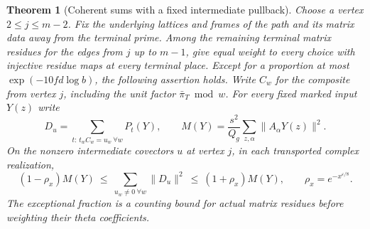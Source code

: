 \documentclass[a4paper,11pt]{article}
\newtheorem{theorem}[proposition]{Theorem}
\theoremstyle{definition}
\theoremstyle{remark}
\numberwithin{equation}{section}
\begin{document}
\begin{theorem}[Coherent sums with a fixed intermediate pullback]
\label{thm:intermediateimage392}
Choose a vertex \(2\le j\le m-2\). Fix the underlying
lattices and frames of the path and its matrix data away from
the terminal prime. Among the remaining terminal matrix
residues for the edges from \(j\) up to \(m-1\), give equal
weight to every choice with injective residue maps at every
terminal place. Except for a proportion at most
\(\exp(-10fd\log b)\), the following assertion holds.
Write \(C_w\) for the composite from vertex \(j\), including
the unit factor \(\bar\pi_T\bmod w\). For every fixed marked
input \(Y(z)\) write
\[
 D_u=\sum_{t:\,t_wC_w=u_w\ \forall w}P_t(Y),\qquad
 M(Y)=\frac{s^2}{Q_g}\sum_{z,\alpha}\|A_\alpha Y(z)\|^2 .
\]
On the nonzero intermediate covectors \(u\) at vertex \(j\),
in each transported complex realization,
\[
 (1-\rho_x)M(Y)\ \le\
           \sum_{u_w\ne0\ \forall w}\|D_u\|^2
     \ \le\ (1+\rho_x)M(Y),\qquad
                \rho_x=e^{-x^{\varepsilon/8}} .
\]
The exceptional fraction is a counting bound for actual
matrix residues before weighting their theta coefficients.
\end{theorem}
\end{document}
